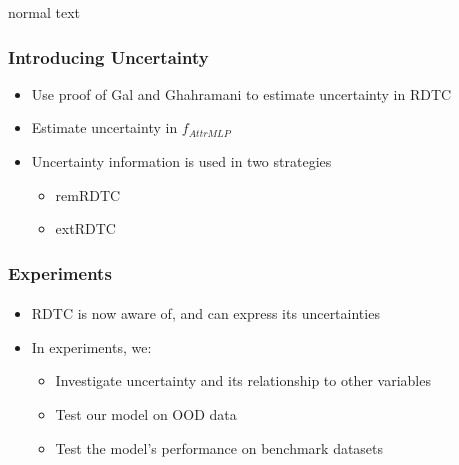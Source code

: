 \documentclass[9pt]{beamer}
\begin{document}
\begin{frame}{normal text}
\frametitle{Introducing Uncertainty}
\begin{itemize}
	\item Use proof of Gal and Ghahramani \cite{gal2016dropout} to estimate uncertainty in RDTC \cite{alaniz2019explainable}
	\item Estimate uncertainty in $f_{AttrMLP}$
	\item Uncertainty information is used in two strategies
	\begin{itemize}
		\item remRDTC
		\item extRDTC
	\end{itemize}
\end{itemize}
\end{frame}





\begin{frame}
\frametitle{Experiments}
\framesubtitle{}
\begin{itemize}
	\item RDTC is now aware of, and can express its uncertainties
	\item In experiments, we:
	\begin{itemize}
		\item Investigate uncertainty and its relationship to other variables
		\item Test our model on OOD data
		\item Test the model's performance on benchmark datasets
	\end{itemize}
\end{itemize}
\end{frame}
\end{document}
